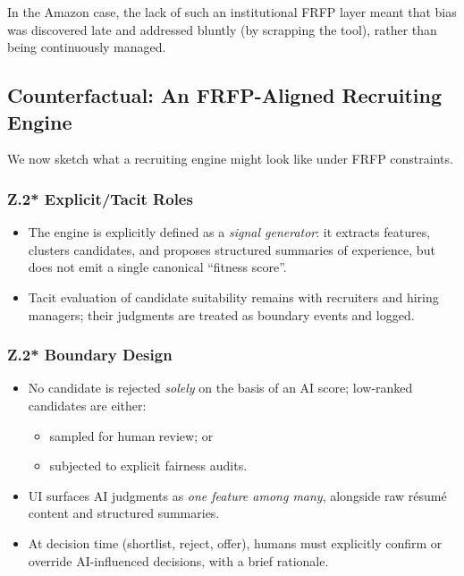 In the Amazon case, the lack of such an institutional FRFP layer meant that
bias was discovered late and addressed bluntly (by scrapping the tool),
rather than being continuously managed.

\subsection{Counterfactual: An FRFP-Aligned Recruiting Engine}

We now sketch what a recruiting engine might look like under FRFP constraints.

\subsubsection*{Z.2* Explicit/Tacit Roles}

\begin{itemize}
  \item The engine is explicitly defined as a \emph{signal generator}:
        it extracts features, clusters candidates, and proposes structured
        summaries of experience, but does not emit a single canonical
        ``fitness score''.
  \item Tacit evaluation of candidate suitability remains with recruiters and
        hiring managers; their judgments are treated as boundary events and
        logged.
\end{itemize}

\subsubsection*{Z.2* Boundary Design}

\begin{itemize}
  \item No candidate is rejected \emph{solely} on the basis of an AI score;
        low-ranked candidates are either:
        \begin{itemize}
          \item sampled for human review; or
          \item subjected to explicit fairness audits.
        \end{itemize}
  \item UI surfaces AI judgments as \emph{one feature among many}, alongside
        raw résumé content and structured summaries.
  \item At decision time (shortlist, reject, offer), humans must explicitly
        confirm or override AI-influenced decisions, with a brief rationale.
\end{itemize}

